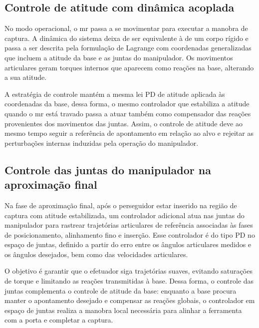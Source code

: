 \subsection{Controle de atitude com dinâmica acoplada}
\label{sec:controle_atitude_Lagrange}

No modo operacional, o \gls{mr} passa a se movimentar para executar a manobra de captura.
A dinâmica do sistema deixa de ser equivalente à de um corpo rígido e passa a ser descrita pela formulação de Lagrange com coordenadas generalizadas que incluem a atitude da base e as juntas do manipulador.
Os movimentos articulares geram torques internos que aparecem como reações na base, alterando a sua atitude.

A estratégia de controle mantém a mesma lei PD de atitude aplicada às coordenadas da base, dessa forma, o mesmo controlador que estabiliza a atitude quando o \gls{mr} está travado passa a atuar também como compensador das reações provenientes dos movimentos das juntas.
Assim, o controle de atitude deve ao mesmo tempo seguir a referência de apontamento em relação ao alvo e rejeitar as perturbações internas induzidas pela operação do manipulador.

\subsection{Controle das juntas do manipulador na aproximação final}
\label{sec:controle_juntas_MR}

Na fase de aproximação final, após o perseguidor estar inserido na região de captura com atitude estabilizada, um controlador adicional atua nas juntas do manipulador para rastrear trajetórias articulares de referência associadas às fases de posicionamento, alinhamento fino e inserção.
Esse controlador é do tipo PD no espaço de juntas, definido a partir do erro entre os ângulos articulares medidos e os ângulos desejados, bem como das velocidades articulares.

O objetivo é garantir que o efetuador siga trajetórias suaves, evitando saturações de torque e limitando as reações transmitidas à base.
Dessa forma, o controle das juntas complementa o controle de atitude da base: enquanto a base procura manter o apontamento desejado e compensar as reações globais, o controlador em espaço de juntas realiza a manobra local necessária para alinhar a ferramenta com a porta e completar a captura.
